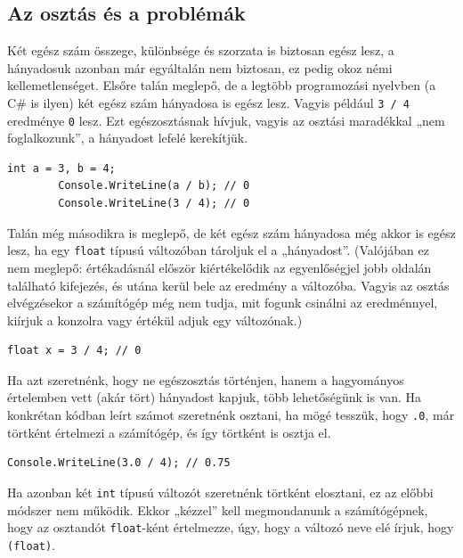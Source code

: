 \documentclass[a4paper]{article}
\begin{document}
	\subsection{Az osztás és a problémák}
	Két egész szám összege, különbsége és szorzata is biztosan egész lesz, a hányadosuk azonban már egyáltalán nem biztosan, ez pedig okoz némi kellemetlenséget. Elsőre talán meglepő, de a legtöbb programozási nyelvben (a C\# is ilyen) két egész szám hányadosa is egész lesz. Vagyis például \lstinline{3 / 4} eredménye \lstinline{0} lesz. Ezt egészosztásnak hívjuk, vagyis az osztási maradékkal „nem foglalkozunk”, a hányadost lefelé kerekítjük.
	
	\begin{lstlisting}[caption=Egészosztás, label=lst:intDiv]
		int a = 3, b = 4;
		Console.WriteLine(a / b); // 0
		Console.WriteLine(3 / 4); // 0
	\end{lstlisting}
	
	Talán még másodikra is meglepő, de két egész szám hányadosa még akkor is egész lesz, ha egy \lstinline{float} típusú változóban tároljuk el a „hányadost”. (Valójában ez nem meglepő: értékadásnál először kiértékelődik az egyenlőségjel jobb oldalán található kifejezés, és utána kerül bele az eredmény a változóba. Vagyis az osztás elvégzésekor a számítógép még nem tudja, mit fogunk csinálni az eredménnyel, kiírjuk a konzolra vagy értékül adjuk egy változónak.)
	
	\begin{lstlisting}[caption=Egészosztás tört változóval, label=lst:intDivFloatVar]
		float x = 3 / 4; // 0
	\end{lstlisting}
	
	Ha azt szeretnénk, hogy ne egészosztás történjen, hanem a hagyományos értelemben vett (akár tört) hányadost kapjuk, több lehetőségünk is van. Ha konkrétan kódban leírt számot szeretnénk osztani, ha mögé tesszük, hogy \lstinline{.0}, már törtként értelmezi a számítógép, és így törtként is osztja el.
	
	\begin{lstlisting}[caption=Tört osztása, label=lst:div]
		Console.WriteLine(3.0 / 4); // 0.75
	\end{lstlisting}
	
	Ha azonban két \lstinline{int} típusú változót szeretnénk törtként elosztani, ez az előbbi módszer nem működik. Ekkor „kézzel” kell megmondanunk a számítógépnek, hogy az osztandót \lstinline{float}-ként értelmezze, úgy, hogy a változó neve elé írjuk, hogy \lstinline{(float)}.
	
\end{document}
